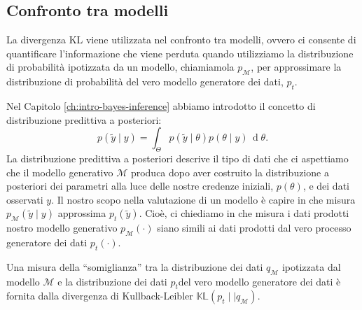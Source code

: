 \documentclass[
  10pt,
  italian,
  a4paper,
  extrafontsizes,onecolumn,openright
  ]{memoir}
\theoremstyle{definition}
\theoremstyle{definition}
\theoremstyle{definition}
\theoremstyle{definition}
\theoremstyle{remark}
\begin{document}
\hypertarget{confronto-tra-modelli}{%
\subsection{Confronto tra modelli}\label{confronto-tra-modelli}}

La divergenza KL viene utilizzata nel confronto tra modelli, ovvero ci consente di quantificare l'informazione che viene perduta quando utilizziamo la distribuzione di probabilità ipotizzata da un modello, chiamiamola \(p_{\mathcal{M}}\), per approssimare la distribuzione di probabilità del vero modello generatore dei dati, \(p_t\).

Nel Capitolo \ref{ch:intro-bayes-inference} abbiamo introdotto il concetto di distribuzione predittiva a posteriori:
\[
p(\tilde{y} \mid y) = \int_\Theta p(\tilde{y} \mid \theta) p(\theta \mid y) \,\operatorname {d}\!\theta .
\]
La distribuzione predittiva a posteriori descrive il tipo di dati che ci aspettiamo che il modello generativo \(\mathcal{M}\) produca dopo aver costruito la distribuzione a posteriori dei parametri alla luce delle nostre credenze iniziali, \(p(\theta)\), e dei dati osservati \(y\). Il nostro scopo nella valutazione di un modello è capire in che misura \(p_{\mathcal{M}}(\tilde{y} \mid y)\) approssima \(p_t(\tilde{y})\). Cioè, ci chiediamo in che misura i dati prodotti nostro modello generativo \(p_{\mathcal{M}}(\cdot)\) siano simili ai dati prodotti dal vero processo generatore dei dati \(p_t(\cdot)\).

Una misura della ``somiglianza'' tra la distribuzione dei dati \(q_{\mathcal{M}}\) ipotizzata dal modello \(\mathcal{M}\) e la distribuzione dei dati \(p_t\)del vero modello generatore dei dati è fornita dalla divergenza di Kullback-Leibler \(\mathbb{KL}(p_t \mid\mid q_{\mathcal{M}})\).
\end{document}
